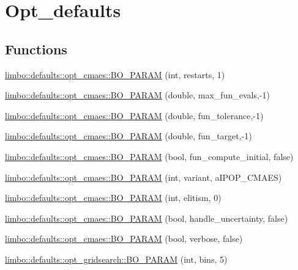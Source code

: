 \hypertarget{group__opt__defaults}{}\section{Opt\+\_\+defaults}
\label{group__opt__defaults}
\subsection*{Functions}
\begin{DoxyCompactItemize}
\item 
\hyperlink{group__opt__defaults_gaba7127b5e591a72095bd6c3a4155828d}{limbo\+::defaults\+::opt\+\_\+cmaes\+::\+B\+O\+\_\+\+P\+A\+R\+A\+M} (int, restarts, 1)
\item 
\hyperlink{group__opt__defaults_ga5130bd236acff913c59380059474ebab}{limbo\+::defaults\+::opt\+\_\+cmaes\+::\+B\+O\+\_\+\+P\+A\+R\+A\+M} (double, max\+\_\+fun\+\_\+evals,-\/1)
\item 
\hyperlink{group__opt__defaults_ga5f980ba02cafe6ee52d6b9cd485e3d05}{limbo\+::defaults\+::opt\+\_\+cmaes\+::\+B\+O\+\_\+\+P\+A\+R\+A\+M} (double, fun\+\_\+tolerance,-\/1)
\item 
\hyperlink{group__opt__defaults_ga1b4276da9161bb04b84b4cd9307a37ab}{limbo\+::defaults\+::opt\+\_\+cmaes\+::\+B\+O\+\_\+\+P\+A\+R\+A\+M} (double, fun\+\_\+target,-\/1)
\item 
\hyperlink{group__opt__defaults_ga14aff955e1360233e5ac361bdd2f3118}{limbo\+::defaults\+::opt\+\_\+cmaes\+::\+B\+O\+\_\+\+P\+A\+R\+A\+M} (bool, fun\+\_\+compute\+\_\+initial, false)
\item 
\hyperlink{group__opt__defaults_gaf6fe5f409527ed056cee8cf8df52da9e}{limbo\+::defaults\+::opt\+\_\+cmaes\+::\+B\+O\+\_\+\+P\+A\+R\+A\+M} (int, variant, a\+I\+P\+O\+P\+\_\+\+C\+M\+A\+E\+S)
\item 
\hyperlink{group__opt__defaults_ga660850db2d1f35863416f9790fe5125e}{limbo\+::defaults\+::opt\+\_\+cmaes\+::\+B\+O\+\_\+\+P\+A\+R\+A\+M} (int, elitism, 0)
\item 
\hyperlink{group__opt__defaults_gad4f97065dd716df6c84e093059ab39f6}{limbo\+::defaults\+::opt\+\_\+cmaes\+::\+B\+O\+\_\+\+P\+A\+R\+A\+M} (bool, handle\+\_\+uncertainty, false)
\item 
\hyperlink{group__opt__defaults_gae78e735b53742e438847fb63817f2ed1}{limbo\+::defaults\+::opt\+\_\+cmaes\+::\+B\+O\+\_\+\+P\+A\+R\+A\+M} (bool, verbose, false)
\item 
\hyperlink{group__opt__defaults_ga0ce56e9b25771d8a1b381b6ec132b8fe}{limbo\+::defaults\+::opt\+\_\+gridsearch\+::\+B\+O\+\_\+\+P\+A\+R\+A\+M} (int, bins, 5)

\end{DoxyCompactItemize}
